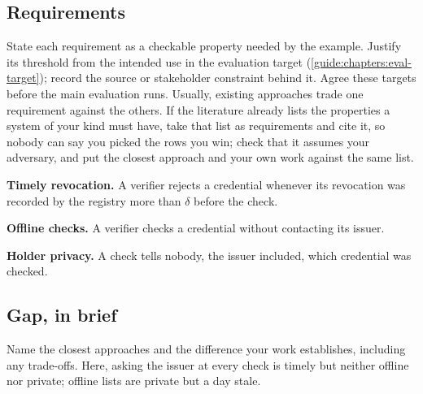 \subsection[Requirements]{Requirements\skimmark}\label{guide:chapters:requirements}
State each requirement as a checkable property needed by the example. Justify its threshold from the intended use in the evaluation target (\cref{guide:chapters:eval-target}); record the source or stakeholder constraint behind it. Agree these targets before the main evaluation runs. Usually, existing approaches trade one requirement against the others. If the literature already lists the properties a system of your kind must have, take that list as requirements and cite it, so nobody can say you picked the rows you win; check that it assumes your adversary, and put the closest approach and your own work against the same list.
\begin{requirements}
  \item\label{guide:req:timely} \textbf{Timely revocation.} A verifier rejects a credential whenever its revocation was recorded by the registry more than $\delta$ before the check.
  \item\label{guide:req:offline} \textbf{Offline checks.} A verifier checks a credential without contacting its issuer.
  \item\label{guide:req:private} \textbf{Holder privacy.} A check tells nobody, the issuer included, which credential was checked.
\end{requirements}

\subsection{Gap, in brief}\label{guide:chapters:introgap}
Name the closest approaches and the difference your work establishes, including any trade-offs. Here, asking the issuer at every check is timely but neither offline nor private; offline lists are private but a day stale.

